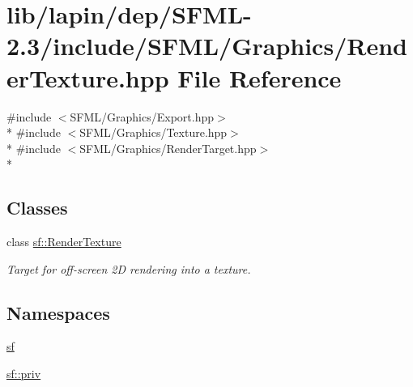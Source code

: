 \hypertarget{lapin_2dep_2_s_f_m_l-2_83_2include_2_s_f_m_l_2_graphics_2_render_texture_8hpp}{\section{lib/lapin/dep/\-S\-F\-M\-L-\/2.3/include/\-S\-F\-M\-L/\-Graphics/\-Render\-Texture.hpp File Reference}
\label{lapin_2dep_2_s_f_m_l-2_83_2include_2_s_f_m_l_2_graphics_2_render_texture_8hpp}
}
{\ttfamily \#include $<$S\-F\-M\-L/\-Graphics/\-Export.\-hpp$>$}\\*
{\ttfamily \#include $<$S\-F\-M\-L/\-Graphics/\-Texture.\-hpp$>$}\\*
{\ttfamily \#include $<$S\-F\-M\-L/\-Graphics/\-Render\-Target.\-hpp$>$}\\*
\subsection*{Classes}
\begin{DoxyCompactItemize}
\item 
class \hyperlink{classsf_1_1_render_texture}{sf\-::\-Render\-Texture}
\begin{DoxyCompactList}\small\item\em Target for off-\/screen 2\-D rendering into a texture. \end{DoxyCompactList}\end{DoxyCompactItemize}
\subsection*{Namespaces}
\begin{DoxyCompactItemize}
\item 
\hyperlink{namespacesf}{sf}
\item 
\hyperlink{namespacesf_1_1priv}{sf\-::priv}
\end{DoxyCompactItemize}
